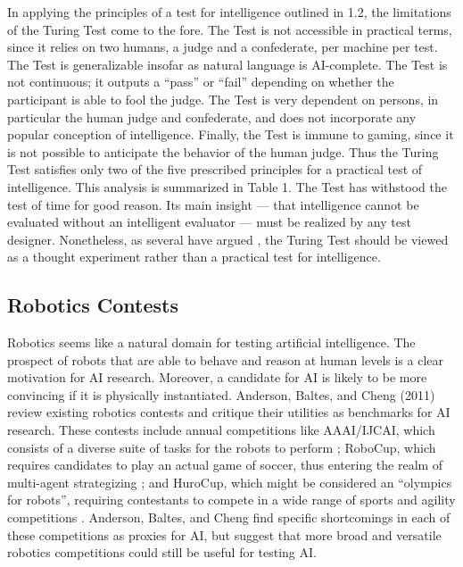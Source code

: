In applying the principles of a test for intelligence outlined in 1.2, the limitations of the Turing Test come to the fore. The Test is not accessible in practical terms, since it relies on two humans, a judge and a confederate, per machine per test. The Test is generalizable insofar as natural language is AI-complete. The Test is not continuous; it outputs a ``pass'' or ``fail'' depending on whether the participant is able to fool the judge. The Test is very dependent on persons, in particular the human judge and confederate, and does not incorporate any popular conception of intelligence. Finally, the Test is immune to gaming, since it is not possible to anticipate the behavior of the human judge. Thus the Turing Test satisfies only two of the five prescribed principles for a practical test of intelligence.  This analysis is summarized in Table 1. The Test has withstood the test of time for good reason. Its main insight ---  that intelligence cannot be evaluated without an intelligent evaluator --- must be realized by any test designer. Nonetheless, as several have argued \cite{hayes95, moor01, shieber15}, the Turing Test should be viewed as a thought experiment rather than a practical test for intelligence. 

\subsection{Robotics Contests}

Robotics seems like a natural domain for testing artificial intelligence. The prospect of robots that are able to behave and reason at human levels is a clear motivation for AI research. Moreover, a candidate for AI is likely to be more convincing if it is physically instantiated. Anderson, Baltes, and Cheng (2011) review existing robotics contests and critique their utilities as benchmarks for AI research. These contests include annual competitions like AAAI/IJCAI, which consists of a diverse suite of tasks for the robots to perform \cite{balch02}; RoboCup, which requires candidates to play an actual game of soccer, thus entering the realm of multi-agent strategizing \cite{kitano97}; and HuroCup, which might be considered an ``olympics for robots'', requiring contestants to compete in a wide range of sports and agility competitions \cite{baltes08}. Anderson, Baltes, and Cheng find specific shortcomings in each of these competitions as proxies for AI, but suggest that more broad and versatile robotics competitions could still be useful for testing AI.


